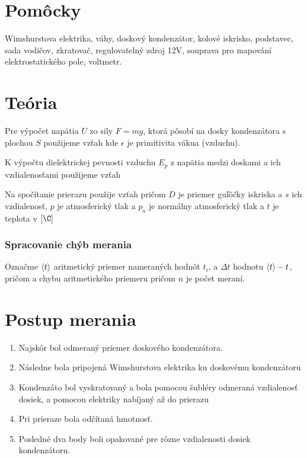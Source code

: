 \documentclass[a4paper,10pt]{article}
\begin{document}
\section{Pomôcky}
Wimshurstova elektrika, váhy, doskový kondenzátor, kolové iskrisko, podstavec,
sada vodičov, zkratovač, regulovatelný zdroj 12V, souprava pro mapování elektrostatického pole,
voltmetr.

\section{Teória}
Pre výpočet napätia $U$ zo sily $F = m g$, ktorá pôsobí na dosky kondenzátora s plochou $S$ použijeme vzťah
kde $\epsilon$ je primitivita vákua (vzduchu).

K výpočtu dielektrickej pevnosti vzduchu $E_p$ z napätia medzi doskami a ich vzdialenosťami použijeme vzťah

Na spočítanie prierazu použije vzťah
pričom $D$ je priemer guľôčky iskriska a $s$ ich vzdialenosť, $p$ je atmosferický tlak a $p_a$ je normálny atmosferický tlak a $t$ je teplota v $[\C]$

\subsubsection{Spracovanie chýb merania}

Označme $\left< t \right>$ aritmetický priemer nameraných hodnôt $t_i$, a $\Delta t$ hodnotu $\left< t \right>-t$, pričom 
a chybu aritmetického priemeru 
pričom $n$ je počet meraní.

\section{Postup merania}
\begin{enumerate}
\item Najskôr bol odmeraný priemer  doskového kondenzátora.
\item Následne bola pripojená Wimshurstova elektrika ku doskovému kondenzátoru
\item Kondenzáto bol vyskratovaný a bola pomocou šubléry odmeraná vzdialenosť dosiek, a pomocou elektriky nabíjaný až do prierazu 
\item Pri prieraze bola odčítaná hmotnosť.
\item Posledné dva body boli opakované pre rôzne vzdialenosti dosiek kondenzátoru.
\end{enumerate}
\end{document}
